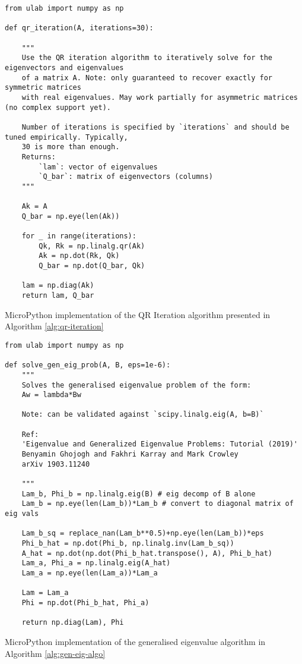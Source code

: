 \begin{listing}[!htb]
\footnotesize
\begin{verbatim}
from ulab import numpy as np

def qr_iteration(A, iterations=30):
    
    """
    Use the QR iteration algorithm to iteratively solve for the eigenvectors and eigenvalues
    of a matrix A. Note: only guaranteed to recover exactly for symmetric matrices
    with real eigenvalues. May work partially for asymmetric matrices (no complex support yet).
    
    Number of iterations is specified by `iterations` and should be tuned empirically. Typically,
    30 is more than enough.
    Returns:
        `lam`: vector of eigenvalues
        `Q_bar`: matrix of eigenvectors (columns)
    """

    Ak = A
    Q_bar = np.eye(len(Ak))

    for _ in range(iterations):
        Qk, Rk = np.linalg.qr(Ak)
        Ak = np.dot(Rk, Qk)
        Q_bar = np.dot(Q_bar, Qk)

    lam = np.diag(Ak)
    return lam, Q_bar

\end{verbatim}
\caption{MicroPython implementation of the QR Iteration algorithm presented in Algorithm \ref{alg:qr-iteration}}
\label{app-listing:qr-iteration-mpy}
\end{listing}

\begin{listing}[h]
\footnotesize
\begin{verbatim}
from ulab import numpy as np

def solve_gen_eig_prob(A, B, eps=1e-6):
    """
    Solves the generalised eigenvalue problem of the form:
    Aw = lambda*Bw
    
    Note: can be validated against `scipy.linalg.eig(A, b=B)`
    
    Ref: 
    'Eigenvalue and Generalized Eigenvalue Problems: Tutorial (2019)'
    Benyamin Ghojogh and Fakhri Karray and Mark Crowley
    arXiv 1903.11240

    """
    Lam_b, Phi_b = np.linalg.eig(B) # eig decomp of B alone
    Lam_b = np.eye(len(Lam_b))*Lam_b # convert to diagonal matrix of eig vals
    
    Lam_b_sq = replace_nan(Lam_b**0.5)+np.eye(len(Lam_b))*eps
    Phi_b_hat = np.dot(Phi_b, np.linalg.inv(Lam_b_sq))
    A_hat = np.dot(np.dot(Phi_b_hat.transpose(), A), Phi_b_hat)
    Lam_a, Phi_a = np.linalg.eig(A_hat)
    Lam_a = np.eye(len(Lam_a))*Lam_a
    
    Lam = Lam_a
    Phi = np.dot(Phi_b_hat, Phi_a)
    
    return np.diag(Lam), Phi

\end{verbatim}
\caption{MicroPython implementation of the generalised eigenvalue algorithm in Algorithm \ref{alg:gen-eig-algo}}
\label{app-listing:gen-eig-prob-mpy}
\end{listing}

